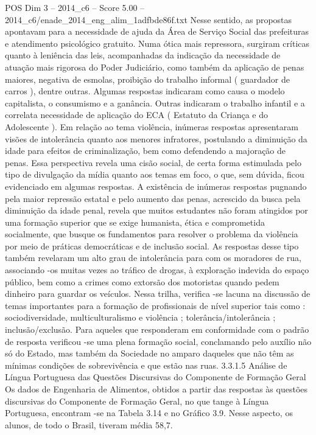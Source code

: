 \begin{textsample}{POS Dim 3 – 2014\_c6 – Score 5.00 – 2014\_c6/enade\_2014\_eng\_alim\_1adfbde86f.txt}
Nesse sentido, as propostas apontavam para a necessidade de ajuda da Área de Serviço Social das prefeituras e atendimento psicológico gratuito.
Numa ótica mais repressora, surgiram críticas quanto à leniência das leis, acompanhadas da indicação da necessidade de atuação mais rigorosa do Poder Judiciário, como também da aplicação de penas maiores, negativa de esmolas, proibição do trabalho informal ( guardador de carros ), dentre outras.
Algumas respostas indicaram como causa o modelo capitalista, o consumismo e a ganância.
Outras indicaram o trabalho infantil e a correlata necessidade de aplicação do ECA ( Estatuto da Criança e do Adolescente ).
Em relação ao tema violência, inúmeras respostas apresentaram visões de intolerância quanto aos menores infratores, postulando a diminuição da idade para efeitos de criminalização, bem como defendendo a majoração de penas.
Essa perspectiva revela uma cisão social, de certa forma estimulada pelo tipo de divulgação da mídia quanto aos temas em foco, o que, sem dúvida, ficou evidenciado em algumas respostas.
A existência de inúmeras respostas pugnando pela maior repressão estatal e pelo aumento das penas, acrescido da busca pela diminuição da idade penal, revela que muitos estudantes não foram atingidos por uma formação superior que se exige humanista, ética e comprometida socialmente, que busque os fundamentos para resolver o problema da violência por meio de práticas democráticas e de inclusão social.
As respostas desse tipo também revelaram um alto grau de intolerância para com os moradores de rua, associando -os muitas vezes ao tráfico de drogas, à exploração indevida do espaço público, bem como a crimes como extorsão dos motoristas quando pedem dinheiro para guardar os veículos.
Nessa trilha, verifica -se lacuna na discussão de temas importantes para a formação de profissionais de nível superior tais como : sociodiversidade, multiculturalismo e violência ; tolerância/intolerância ; inclusão/exclusão.
Para aqueles que responderam em conformidade com o padrão de resposta verificou -se uma plena formação social, conclamando pelo auxílio não só do Estado, mas também da Sociedade no amparo daqueles que não têm as mínimas condições de sobrevivência e que estão nas ruas. 3.3.1.5 Análise de Língua Portuguesa das Questões Discursivas do Componente de Formação Geral Os dados de Engenharia de Alimentos, obtidos a partir das respostas às questões discursivas do Componente de Formação Geral, no que tange à Língua Portuguesa, encontram -se na Tabela 3.14 e no Gráfico 3.9.
Nesse aspecto, os alunos, de todo o Brasil, tiveram média 58,7.

\end{textsample}
